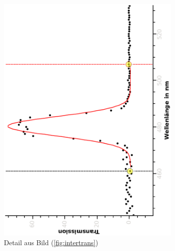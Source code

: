 \documentclass{article}
\begin{document}
\begin{figure}[H]
\begin{subfigure}[h]{0.4\textwidth}
\includegraphics[width=\textwidth ,angle=-90]{eps/intertransdetail.eps}
\caption{Detail aus Bild (\ref{fig:intertrans})  \label{fig:interfdetail} }
\end{subfigure}
\begin{subfigure}[h]{0.4\textwidth}


\end{subfigure}
\end{figure}
\end{document}
